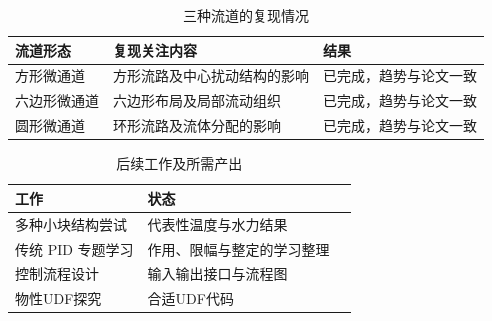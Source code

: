 \documentclass[stage1,fontset=fandol]{ydzjreport}
\begin{document}
\clearpage
\setcounter{table}{4}
\begin{table}[H]
		\centering
		\caption{三种流道的复现情况}
		\label{tab:repro}
		\begin{tabularx}{\textwidth}{@{}Y Y Y@{}}
			\toprule
{} 流道形态 & 复现关注内容 & 结果 \\
			\midrule
			方形微通道 & 方形流路及中心扰动结构的影响 & 已完成，趋势与论文一致 \\
			六边形微通道 & 六边形布局及局部流动组织 & 已完成，趋势与论文一致 \\
			圆形微通道 & 环形流路及流体分配的影响 & 已完成，趋势与论文一致 \\

			\bottomrule
		\end{tabularx}
	\end{table}
\clearpage
\setcounter{table}{5}
\begin{table}[H]\centering
\caption{后续工作及所需产出}\label{tab:plan}
\begin{tabularx}{\textwidth}{@{}Y Y Y@{}}
\toprule
{} 工作 & 状态  \\
\midrule
多种小块结构尝试 & 代表性温度与水力结果  \\
传统 PID 专题学习 & 作用、限幅与整定的学习整理  \\
控制流程设计 & 输入输出接口与流程图  \\
物性UDF探究 & 合适UDF代码  \\
\bottomrule\end{tabularx}\end{table}
\clearpage
\end{document}
